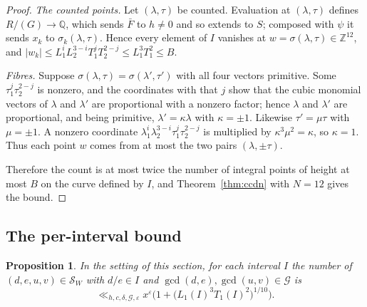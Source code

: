 \documentclass[11pt,reqno]{amsart}
\newtheorem{proposition}[theorem]{Proposition}
\theoremstyle{definition}
\theoremstyle{remark}
\numberwithin{equation}{section}
\newcommand{\Z}{\mathbb Z}
\newcommand{\Q}{\mathbb Q}
\begin{document}
\begin{proof}
\emph{The counted points.} Let $(\lambda,\tau)$ be counted. Evaluation at
$(\lambda,\tau)$ defines $R/(G)\to\Q$, which sends $\bar F$ to $h\ne0$ and so
extends to $S$; composed with $\psi$ it sends $x_k$ to $\sigma_k(\lambda,\tau)$.
Hence every element of $I$ vanishes at $w=\sigma(\lambda,\tau)\in\Z^{12}$, and
$|w_k|\le L_1^iL_2^{3-i}T_1^jT_2^{2-j}\le L_1^3T_1^2\le B$.

\emph{Fibres.} Suppose $\sigma(\lambda,\tau)=\sigma(\lambda',\tau')$ with all
four vectors primitive. Some $\tau_1^j\tau_2^{2-j}$ is nonzero, and the
coordinates with that $j$ show that the cubic monomial vectors of $\lambda$
and $\lambda'$ are proportional with a nonzero factor; hence $\lambda$ and
$\lambda'$ are proportional, and being primitive, $\lambda'=\kappa\lambda$
with $\kappa=\pm1$. Likewise $\tau'=\mu\tau$ with $\mu=\pm1$. A nonzero
coordinate $\lambda_1^i\lambda_2^{3-i}\tau_1^j\tau_2^{2-j}$ is multiplied by
$\kappa^3\mu^2=\kappa$, so $\kappa=1$. Thus each point $w$ comes from at most
the two pairs $(\lambda,\pm\tau)$.

Therefore the count is at most twice the number of integral points of height
at most $B$ on the curve defined by $I$, and Theorem~\ref{thm:ccdn} with
$N=12$ gives the bound.
\end{proof}

\subsection{The per-interval bound}
\begin{proposition}\label{prop:interval}
In the setting of this section, for each interval $I$ the number of
$(d,e,u,v)\in\mathcal S_W$ with $d/e\in I$ and $\gcd(d,e),\gcd(u,v)\in\mathcal G$ is
\[
\ll_{h,c,\delta,\mathcal G,\varepsilon}x^{\varepsilon}\Big(1+\big(L_1(I)^3T_1(I)^2\big)^{1/10}\Big).
\]
\end{proposition}
\end{document}
